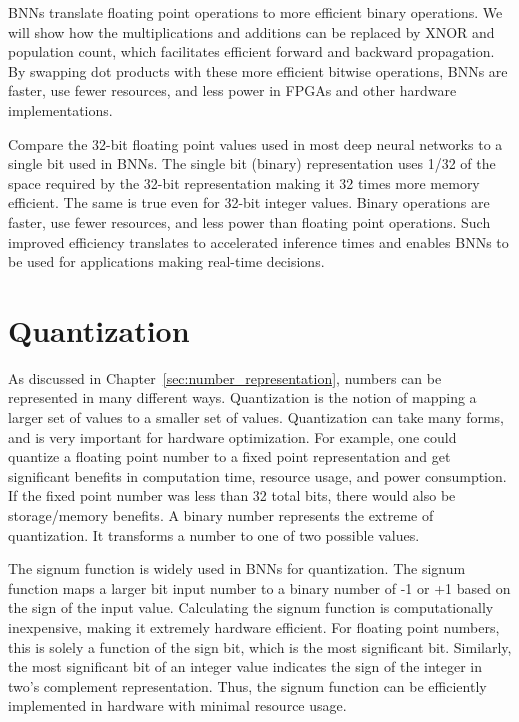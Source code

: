 BNNs translate floating point operations to more efficient binary operations. We will show how the multiplications and additions can be replaced by XNOR and population count, which facilitates efficient forward and backward propagation. By swapping dot products with these more efficient bitwise operations, BNNs are faster, use fewer resources, and less power in FPGAs and other hardware implementations. 

Compare the 32-bit floating point values used in most deep neural networks to a single bit used in BNNs. 
The single bit (binary) representation uses 1/32 of the space required by the 32-bit representation making it 32 times more memory efficient. 
The same is true even for 32-bit integer values. %
Binary operations are faster, use fewer resources, and less power than floating point operations. 
Such improved efficiency translates to accelerated inference times and enables BNNs to be used for applications making real-time decisions.

\section{Quantization}

As discussed in Chapter~\ref{sec:number_representation}, numbers can be represented in many different ways. 
Quantization is the notion of mapping a larger set of values to a smaller set of values. 
Quantization can take many forms, and is very important for hardware optimization. 
For example, one could quantize a floating point number to a fixed point representation and get significant benefits in computation time, resource usage, and power consumption.
If the fixed point number was less than 32 total bits, there would also be storage/memory benefits.
A binary number represents the extreme of quantization.
It transforms a number to one of two possible values. 

The signum function is widely used in BNNs for quantization. The signum function maps a larger bit input number to a binary number of -1 or +1 based on the sign of the input value. 
Calculating the signum function is computationally inexpensive, making it extremely hardware efficient.
For floating point numbers, this is solely a function of the sign bit, which is the most significant bit. 
Similarly, the most significant bit of an integer value indicates the sign of the integer in two's complement representation.
Thus, the signum function can be efficiently implemented in hardware with minimal resource usage.  

